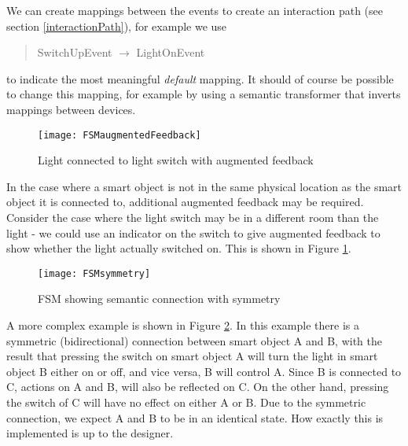 We can create mappings between the events to create an interaction path (see section \ref{interactionPath}), for example we use

\begin{quote}
SwitchUpEvent $\rightarrow$ LightOnEvent %
\end{quote}

to indicate the most meaningful \emph{default} mapping. It should of course be possible to change this mapping, for example by using a semantic transformer that inverts mappings between devices.

\begin{figure}
\centerline{\texttt{[image: FSMaugmentedFeedback]}}
\caption{Light connected to light switch with augmented feedback}
\label{FSMaugmentedFeedback}
\end{figure}

In the case where a smart object is not in the same physical location as the smart object it is connected to, additional augmented feedback may be required. Consider the case where the light switch may be in a different room than the light - we could use an indicator on the switch to give augmented feedback to show whether the light actually switched on. This is shown in Figure \ref{FSMaugmentedFeedback}.

\begin{figure}
\centerline{\texttt{[image: FSMsymmetry]}}
\caption{FSM showing semantic connection with symmetry}
\label{FSMsymmetry}
\end{figure}

A more complex example is shown in Figure \ref{FSMsymmetry}. In this example there is a symmetric (bidirectional) connection between smart object A and B, with the result that pressing the switch on smart object A will turn the light in smart object B either on or off, and vice versa, B will control A. Since B is connected to C, actions on A and B, will also be reflected on C. On the other hand, pressing the switch of C will have no effect on either A or B. Due to the symmetric connection, we expect A and B to be in an identical state. How exactly this is implemented is up to the designer. 

